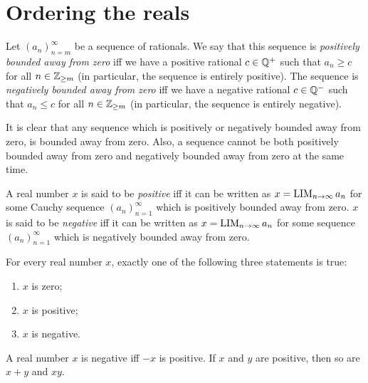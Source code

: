 \section{Ordering the reals}\label{i:sec:5.4}

\begin{defn}\label{i:5.4.1}
  Let \((a_n)_{n = m}^{\infty}\) be a sequence of rationals.
  We say that this sequence is \emph{positively bounded away from zero} iff we have a positive rational \(c \in \mathbb{Q}^+\) such that \(a_n \geq c\) for all \(n \in \mathbb{Z}_{\geq m}\) (in particular, the sequence is entirely positive).
  The sequence is \emph{negatively bounded away from zero} iff we have a negative rational \(c \in \mathbb{Q}^-\) such that \(a_n \leq c\) for all \(n \in \mathbb{Z}_{\geq m}\) (in particular, the sequence is entirely negative).
\end{defn}

\begin{note}
  It is clear that any sequence which is positively or negatively bounded away from zero, is bounded away from zero.
  Also, a sequence cannot be both positively bounded away from zero and negatively bounded away from zero at the same time.
\end{note}

\setcounter{thm}{2}
\begin{defn}\label{i:5.4.3}
  A real number \(x\) is said to be \emph{positive} iff it can be written as \(x = \operatorname*{LIM}_{n \to \infty} a_n\) for some Cauchy sequence \((a_n)_{n = 1}^{\infty}\) which is positively bounded away from zero.
  \(x\) is said to be \emph{negative} iff it can be written as \(x = \operatorname*{LIM}_{n \to \infty} a_n\) for some sequence \((a_n)_{n = 1}^{\infty}\) which is negatively bounded away from zero.
\end{defn}

\begin{prop}\label{i:5.4.4}
  For every real number \(x\), exactly one of the following three statements is true:
  \begin{enumerate}
    \item \(x\) is zero;
    \item \(x\) is positive;
    \item \(x\) is negative.
  \end{enumerate}
  A real number \(x\) is negative iff \(-x\) is positive.
  If \(x\) and \(y\) are positive, then so are \(x + y\) and \(xy\).
\end{prop}

